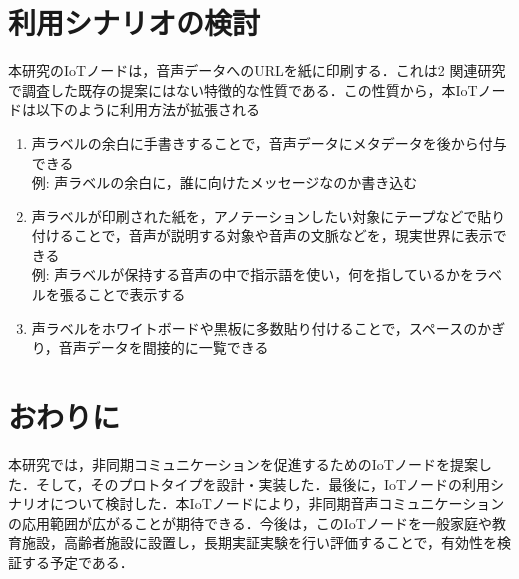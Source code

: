 \documentclass[submit,techrep,noauthor]{ipsj}
\begin{document}
\section{利用シナリオの検討}
本研究のIoTノードは，音声データへのURLを紙に印刷する．これは2 関連研究で調査した既存の提案にはない特徴的な性質である．この性質から，本IoTノードは以下のように利用方法が拡張される
\begin{enumerate}
    \item 声ラベルの余白に手書きすることで，音声データにメタデータを後から付与できる\\例: 声ラベルの余白に，誰に向けたメッセージなのか書き込む
    \item 声ラベルが印刷された紙を，アノテーションしたい対象にテープなどで貼り付けることで，音声が説明する対象や音声の文脈などを，現実世界に表示できる\cite{cyber} \\例: 声ラベルが保持する音声の中で指示語を使い，何を指しているかをラベルを張ることで表示する
    \item 声ラベルをホワイトボードや黒板に多数貼り付けることで，スペースのかぎり，音声データを間接的に一覧できる
\end{enumerate}

\section{おわりに}
本研究では，非同期コミュニケーションを促進するためのIoTノードを提案した．そして，そのプロトタイプを設計・実装した．最後に，IoTノードの利用シナリオについて検討した．本IoTノードにより，非同期音声コミュニケーションの応用範囲が広がることが期待できる．今後は，このIoTノードを一般家庭や教育施設，高齢者施設に設置し，長期実証実験を行い評価することで，有効性を検証する予定である．



 
\end{document}
